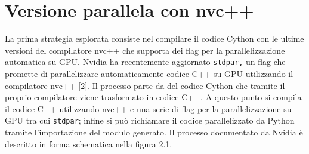 \documentclass[12pt,a4paper]{report}
\begin{document}
\chapter{Versione parallela con nvc++} 
La prima strategia esplorata consiste nel compilare il codice Cython con le ultime versioni del compilatore nvc++ che supporta dei flag per la parallelizzazione automatica su GPU.  Nvidia ha recentemente aggiornato \verb|stdpar,|  un flag che promette di parallelizzare automaticamente codice C++ su GPU utilizzando il compilatore nvc++ [2]. \newline
Il processo parte da del codice Cython che tramite il proprio compilatore viene trasformato in codice C++.  A questo punto si compila il codice C++ utilizzando nvc++ e una serie di flag per la parallelizzazione su GPU tra cui \verb|stdpar|; infine si può richiamare il codice parallelizzato da Python tramite l'importazione del modulo generato. \newline
Il processo documentato da Nvidia è descritto in forma schematica nella figura 2.1.
\begin{figure}[H]
\centering
\begin{floatrow}[1]
\end{floatrow}
\end{figure} \newpage
\end{document}

